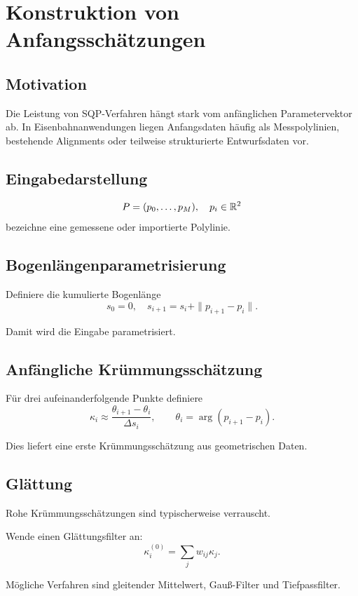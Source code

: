 \section{Konstruktion von Anfangsschätzungen}
\subsection{Motivation}
Die Leistung von SQP-Verfahren hängt stark vom anfänglichen Parametervektor
ab. In Eisenbahnanwendungen liegen Anfangsdaten häufig als Messpolylinien,
bestehende Alignments oder teilweise strukturierte Entwurfsdaten vor.

\subsection{Eingabedarstellung}
\begin{definition}[Eingabepolylinie]
\[
P=(p_0,\dots,p_M),\quad p_i\in\mathbb{R}^2
\]
bezeichne eine gemessene oder importierte Polylinie.
\end{definition}

\subsection{Bogenlängenparametrisierung}
\begin{definition}
Definiere die kumulierte Bogenlänge
\[
s_0=0,\quad s_{i+1}=s_i+\|p_{i+1}-p_i\|.
\]
\end{definition}
Damit wird die Eingabe parametrisiert.

\subsection{Anfängliche Krümmungsschätzung}
\begin{definition}
Für drei aufeinanderfolgende Punkte definiere
\[
\kappa_i\approx\frac{\theta_{i+1}-\theta_i}{\Delta s_i},
\qquad\theta_i=\arg(p_{i+1}-p_i).
\]
\end{definition}
Dies liefert eine erste Krümmungsschätzung aus geometrischen Daten.

\subsection{Glättung}
Rohe Krümmungsschätzungen sind typischerweise verrauscht.
\begin{definition}[Glättungsoperator]
Wende einen Glättungsfilter an:
\[
\kappa_i^{(0)}=\sum_jw_{ij}\kappa_j.
\]
\end{definition}
Mögliche Verfahren sind gleitender Mittelwert, Gauß-Filter und Tiefpassfilter.

